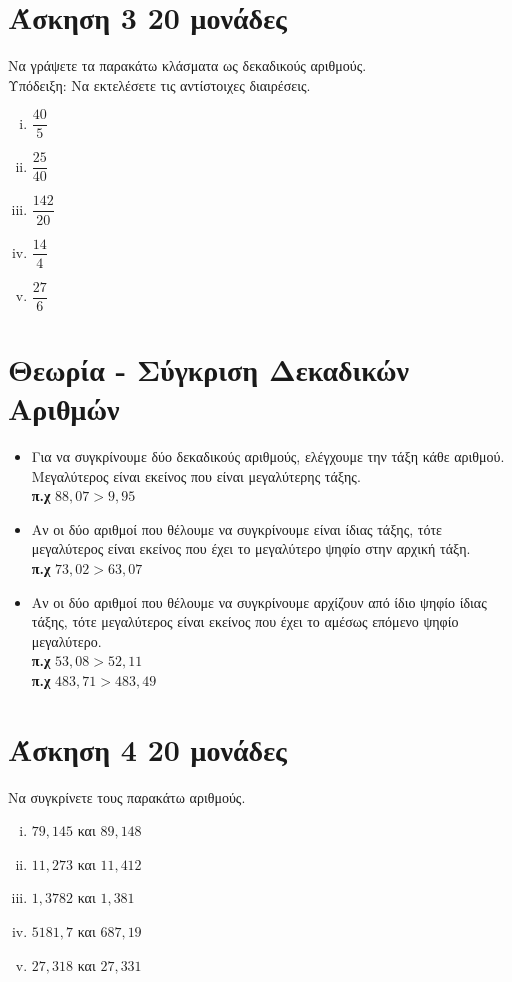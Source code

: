 \documentclass[a4paper,10pt]{report}
\begin{document}
\section*{Άσκηση 3  \hfill \small{20 μονάδες}}
Να γράψετε τα παρακάτω κλάσματα ως δεκαδικούς αριθμούς.\\
Υπόδειξη: Να εκτελέσετε τις αντίστοιχες διαιρέσεις.
\begin{enumerate}[i)]
 \item $\dfrac{40}{5}$
 \item $\dfrac{25}{40}$
 \item $\dfrac{142}{20}$
 \item $\dfrac{14}{4}$
 \item $\dfrac{27}{6}$
\end{enumerate}

\section*{Θεωρία - Σύγκριση Δεκαδικών Αριθμών\hfill \small{}}
\begin{itemize}
 \item Για να συγκρίνουμε δύο δεκαδικούς αριθμούς, ελέγχουμε την τάξη κάθε αριθμού. Μεγαλύτερος είναι 
       εκείνος που είναι μεγαλύτερης τάξης.\\
      \textbf{π.χ} $88,07 > 9,95$
 \item Αν οι δύο αριθμοί που θέλουμε να συγκρίνουμε είναι ίδιας τάξης, τότε μεγαλύτερος είναι εκείνος 
       που έχει το μεγαλύτερο ψηφίο στην αρχική τάξη.\\
       \textbf{π.χ} $73,02 > 63,07$
 \item Αν οι δύο αριθμοί που θέλουμε να συγκρίνουμε αρχίζουν από ίδιο ψηφίο ίδιας τάξης, τότε μεγαλύτερος 
       είναι εκείνος που έχει το αμέσως επόμενο ψηφίο μεγαλύτερο.\\
      \textbf{π.χ} $53,08 > 52,11$\\
      \textbf{π.χ} $483,71 > 483,49$
\end{itemize}



\section*{Άσκηση 4  \hfill \small{20 μονάδες}}
Να συγκρίνετε τους παρακάτω αριθμούς.
\begin{enumerate}[i)]
 \item $79,145$ και $89,148$
 \item $11,273$ και $11,412$
 \item $1,3782$ και $1,381$
 \item $5181,7$ και $687,19$
 \item $27,318$ και $27,331$
\end{enumerate}
\end{document}
